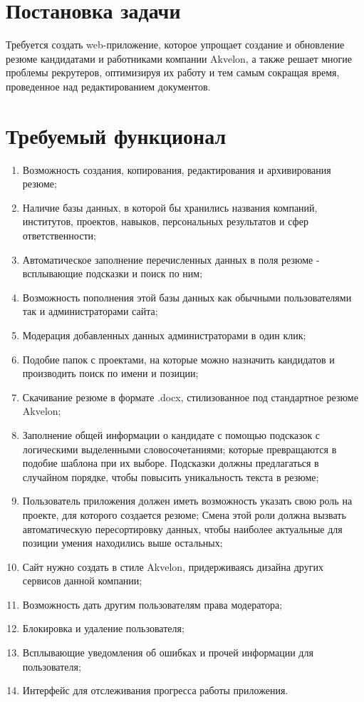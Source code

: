 \documentclass[14pt, a4paper]{diplom}
\begin{document}
\section{Постановка задачи}

Требуется создать web-приложение, которое упрощает создание и обновление резюме кандидатами и работниками компании Akvelon,
а также решает многие проблемы рекрутеров, оптимизируя их работу и тем самым сокращая время,
проведенное над редактированием документов.

\section{Требуемый функционал}

\begin{enumerate}
\item Возможность создания, копирования, редактирования и архивирования резюме;
\item Наличие базы данных, в которой бы хранились названия компаний, институтов,
проектов, навыков, персональных результатов и сфер ответственности;
\item Автоматическое заполнение перечисленных данных в поля резюме - всплывающие подсказки и поиск по ним;
\item Возможность пополнения этой базы данных как обычными пользователями так и администраторами сайта;
\item Модерация добавленных данных администраторами в один клик;
\item Подобие папок с проектами, на которые можно назначить кандидатов и производить поиск по имени и позиции;
\item Скачивание резюме в формате .docx, стилизованное под стандартное резюме Akvelon;
\item Заполнение общей информации о кандидате с помощью подсказок с логическими выделенными словосочетаниями;
которые превращаются в подобие шаблона при их выборе. Подсказки должны предлагаться в случайном порядке, чтобы повысить уникальность текста в резюме;
\item Пользователь приложения должен иметь возможность указать свою роль на проекте, для которого создается резюме;
Смена этой роли должна вызвать автоматическую пересортировку данных,
чтобы наиболее актуальные для позиции умения находились выше остальных;
\item Сайт нужно создать в стиле Akvelon, придерживаясь дизайна других сервисов данной
компании;
\item Возможность дать другим пользователям права модератора;
\item Блокировка и удаление пользователя;
\item Всплывающие уведомления об ошибках и прочей информации для пользователя;
\item Интерфейс для отслеживания прогресса работы приложения.
\end{enumerate}
\end{document}
